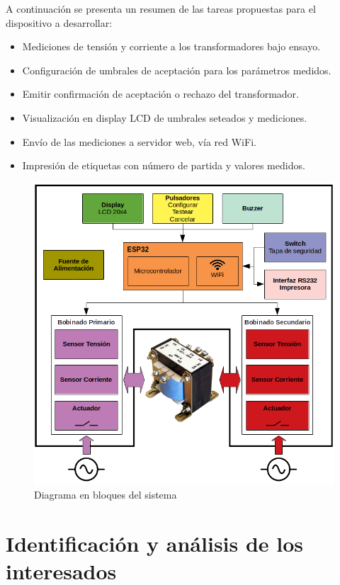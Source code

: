 \documentclass[11pt]{charter}
\begin{document}
A continuación se presenta un resumen de las tareas propuestas para el dispositivo a desarrollar:
\begin{itemize}
\item Mediciones de tensión y corriente a los transformadores bajo ensayo.
\item Configuración de umbrales de aceptación para los parámetros medidos.
\item Emitir confirmación de aceptación o rechazo del transformador.
\item Visualización en display LCD de umbrales seteados y mediciones.
\item Envío de las mediciones a servidor web, vía red WiFi.
\item Impresión de etiquetas con número de partida y valores medidos. 
\end{itemize}

\begin{figure}[htpb]
\centering 
\includegraphics[width=.8\textwidth]{./Figuras/diagBloques.png}
\caption{Diagrama en bloques del sistema}
\label{fig:diagBloques}
\end{figure}

\section{Identificación y análisis de los interesados}
\label{sec:interesados}
\end{document}
